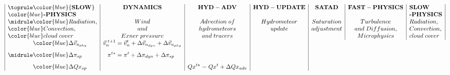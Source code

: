 %

\jot=8pt
\begin{align*}
\begin{array}{|l|c|c|c|c|c|l|}
\toprule
\color{blue}{\bf SLOW} & {\bf DYNAMICS}& {\bf HYD-ADV} &  {\bf HYD-UPDATE} &{\bf
 SATAD}&{\bf FAST-PHYSICS} & {\bf SLOW} \\ 
\color{blue}\textbf{-PHYSICS} &&&&&& \textbf{-PHYSICS}\\ 
\midrule
\color{blue} Radiation, &  Wind & Advection \; of & Hydrometeor  &
 Saturation & Turbulence   & Radiation, \\
\color{blue} Convection, & and  &hydrometeors &update & adjustment& and \;Diffusion,&  Convection, \\
\color{blue} cloud \;cover &Exner \; pressure & and \; tracers& & &  Microphysics&  cloud \; cover \\
\midrule
\begin{aligned}
&\color{blue} \Delta \vec{v}_{n_{phy}}\\[8pt]
&\color{blue} \Delta \pi_{sp} \\[8pt]
&\color{blue} \Delta Qx_{sp} 
 \end{aligned} &  
\begin{aligned}
   \vec{v}_n^{\; t+1}&=\vec{v}_n^t +\Delta
   \vec{v}_{n_{dyn}}+\Delta \vec{v}_{n_{phy}} \\[8pt]
 \pi^{t \star}&=\pi^{t} +\Delta \pi_{dyn}+\Delta \pi_{sp}\\[8pt]
&
\end{aligned}
&
\begin{aligned}
& \\[8pt]
& \\[8pt]
&Qx^{t \star}=Qx^{t}+\Delta Qx_{adv}\end{aligned} &

\end{array}
\end{align*}
